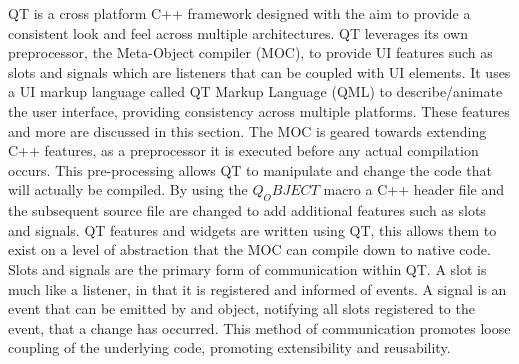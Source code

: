 QT is a cross platform C++ framework designed with the aim to provide a consistent look and feel across multiple architectures. QT leverages its own preprocessor, the Meta-Object compiler (MOC), to provide UI features such as slots and signals which are listeners that can be coupled with UI elements. It uses a UI markup language called QT Markup Language (QML) to describe/animate the user interface, providing consistency across multiple platforms. These features and more are discussed in this section.
  The MOC is geared towards extending C++ features, as a preprocessor it is executed before any actual compilation occurs. This pre-processing allows QT to manipulate and change the code that will actually be compiled. By using the $Q_OBJECT$ macro a C++ header file and the subsequent source file are changed to add additional features such as slots and signals. QT features and widgets are written using QT, this allows them to exist on a level of abstraction that the MOC can compile down to native code.
  Slots and signals are the primary form of communication within QT. A slot is much like a listener, in that it is registered and informed of events. A signal is an event that can be emitted by and object, notifying all slots registered to the event, that a change has occurred. This method of communication promotes loose coupling of the underlying code, promoting extensibility and reusability.

